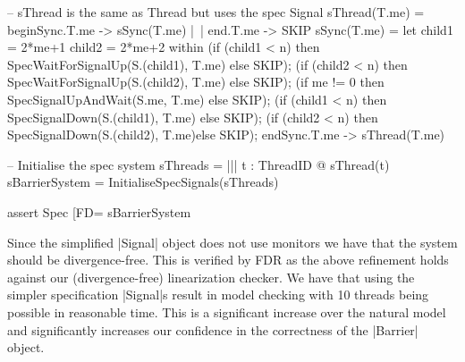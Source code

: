 \begin{cspm}[caption={The implementation of the {\scalastyle Barrier} based on }]
-- sThread is the same as Thread but uses the spec Signal
sThread(T.me) = beginSync.T.me -> sSync(T.me) |~| end.T.me -> SKIP
sSync(T.me) = 
  let child1 = 2*me+1 
      child2 = 2*me+2
  within (if (child1 < n) then SpecWaitForSignalUp(S.(child1), T.me) else SKIP);
        (if (child2 < n) then SpecWaitForSignalUp(S.(child2), T.me) else SKIP);
        (if me != 0 then SpecSignalUpAndWait(S.me, T.me) else SKIP);
        (if (child1 < n) then SpecSignalDown(S.(child1), T.me) else SKIP);
        (if (child2 < n) then SpecSignalDown(S.(child2), T.me)else SKIP);
        endSync.T.me -> sThread(T.me)

-- Initialise the spec system
sThreads = ||| t : ThreadID @ sThread(t)     
sBarrierSystem = InitialiseSpecSignals(sThreads)

assert Spec [FD= sBarrierSystem
\end{cspm}

Since the simplified |Signal| object does not use monitors we have that the system should be divergence-free. This is verified by FDR as the above refinement holds against our (divergence-free) linearization checker. We have that using the simpler specification |Signal|s result in model checking with 10 threads being possible in reasonable time. This is a significant increase over the natural model and significantly increases our confidence in the correctness of the |Barrier| object.









